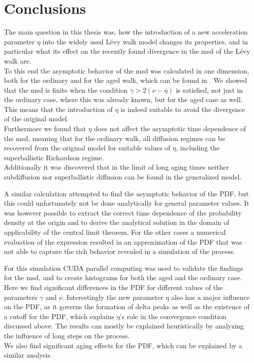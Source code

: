\chapter{Conclusions}

The main question in this thesis was, how the introduction of a new acceleration parameter $\eta$ into the widely used L\'evy walk model changes its properties, and in particular what its effect on the recently found divergence in the \gls*{msd} of the L\'evy walk are. \\
To this end the asymptotic behavior of the \gls*{msd} was calculated in one dimension, both for the ordinary and for the aged walk, which can be found in 
\cite{bothe}. 
We showed that the \gls*{msd} is finite when the condition $\gamma > 2(\nu-\eta)$ is satisfied, not just in the ordinary case, where this was already known\cite{radons2018}, 
but for the aged case as well. This means that the introduction of $\eta$ is indeed suitable to avoid the divergence of the original model. \\
Furthermore we found that $\eta$ does not affect the asymptotic time dependence of the \gls*{msd}, meaning that for the ordinary walk, all diffusion regimes can be recovered from the original model for suitable values of $\eta$, including the superballistic Richardson regime. \\
Additionally it was discovered that in the limit of long aging times neither subdiffusion nor superballistic diffusion can be found in the generalized model.

A similar calculation attempted to find the asymptotic behavior of the \gls*{PDF}, but this could unfortunately not be done analytically for general parameter values. It was however possible to extract the correct time dependence of the probability density at the origin and to derive the analytical solution in the domain of applicability of the central limit theorem. For the other cases a numerical evaluation of the expression resulted in an approximation of the \gls*{PDF} that was not able to capture the rich behavior revealed in a simulation of the process. 

For this simulation CUDA parallel computing was used to validate the findings for the \gls*{msd}, and to create histograms for both the aged and the ordinary case. Here we find significant differences in the \gls*{PDF} for different values of the parameters $\gamma$ and $\nu$. Interestingly the new parameter $\eta$ also has a major influence on the \gls*{PDF}, as it governs the formation of delta peaks as well as the existence of a cutoff for the \gls*{PDF}, which explains $\eta$'s role in the convergence condition discussed above. The results can mostly be explained heuristically by analyzing the influence of long steps on the process. \\
We also find significant aging effects for the \gls*{PDF}, which can be explained by a similar analysis.

